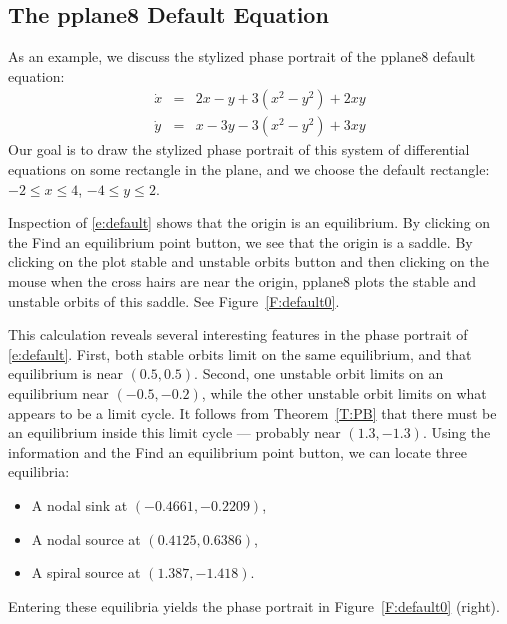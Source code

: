 \documentclass{ximera}
\begin{document}
\subsection*{The {\sf pplane8} Default Equation}

As an example, we discuss the stylized phase portrait of the 
{\sf pplane8} default equation:
\begin{equation}  \label{e:default}
\begin{array}{rcl}
\dot{x} & = & 2x-y+3(x^2-y^2)+2xy \\
\dot{y} & = & x-3y-3(x^2-y^2)+3xy
\end{array}
\end{equation} 
Our goal is to draw the stylized phase portrait of this system
of differential equations on some rectangle in the plane, and we
choose the default rectangle: $-2\leq x\leq 4$, $-4\leq y\leq 2$.

Inspection of \eqref{e:default} shows that the origin 
is an equilibrium.  By clicking on the {\sf Find an equilibrium point}
button, we see that the origin is a saddle.  By clicking on the
{\sf plot stable and unstable orbits} button and then clicking
on the mouse when the cross hairs are near the origin, {\sf
pplane8} plots the stable and unstable orbits of this saddle.
See Figure~\ref{F:default0}.

\begin{figure*}[htb]
           \centerline{%
	   }
           \caption{(Left) Stable and unstable orbits of the saddle at
		the origin in \protect\eqref{e:default}. (Right) Picture 
		of \protect\eqref{e:default} with equilibria added.}
           \label{F:default0}
\end{figure*}
 
This calculation reveals several interesting features in the
phase portrait of \eqref{e:default}.  First, both stable orbits limit on the 
same equilibrium, and that equilibrium is near $(0.5,0.5)$.  Second, one 
unstable orbit limits on an equilibrium near $(-0.5,-0.2)$, while the other 
unstable orbit limits on what appears to be a limit cycle.  It follows from 
Theorem~\ref{T:PB} that there must be an equilibrium inside this limit cycle 
--- probably near $(1.3,-1.3)$.  Using the information and the {\sf
Find an equilibrium point} button, we can locate three
equilibria:
\begin{itemize}
\item	A nodal sink at $(-0.4661,-0.2209)$,
\item	A nodal source at $(0.4125,0.6386)$,
\item	A spiral source at $(1.387,-1.418)$. 
\end{itemize}
Entering these equilibria yields the phase portrait in 
Figure~\ref{F:default0} (right). 
\end{document}
